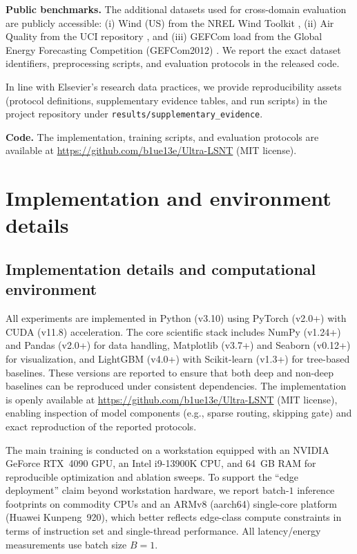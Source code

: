 \documentclass[review,3p,times]{elsarticle}
\begin{document}
\textbf{Public benchmarks.} The additional datasets used for cross-domain evaluation are publicly accessible: (i) Wind (US) from the NREL Wind Toolkit \cite{draxl2015windtoolkit}, (ii) Air Quality from the UCI repository \cite{devito2008}, and (iii) GEFCom load from the Global Energy Forecasting Competition (GEFCom2012) \cite{Hong2014GEFCom2012}. We report the exact dataset identifiers, preprocessing scripts, and evaluation protocols in the released code.

In line with Elsevier's research data practices, we provide reproducibility assets (protocol definitions, supplementary evidence tables, and run scripts) in the project repository under \texttt{results/supplementary\_evidence}.

\textbf{Code.} The implementation, training scripts, and evaluation protocols are available at \url{https://github.com/b1ue13e/Ultra-LSNT} (MIT license).

\appendix

\section{Implementation and environment details}\label{app:impl_details}

\subsection{Implementation details and computational environment}
\label{app:impl_details_sub}

All experiments are implemented in Python (v3.10) using PyTorch (v2.0+) with CUDA (v11.8) acceleration. The core scientific stack includes NumPy (v1.24+) and Pandas (v2.0+) for data handling, Matplotlib (v3.7+) and Seaborn (v0.12+) for visualization, and LightGBM (v4.0+) with Scikit-learn (v1.3+) for tree-based baselines. These versions are reported to ensure that both deep and non-deep baselines can be reproduced under consistent dependencies. The implementation is openly available at \url{https://github.com/b1ue13e/Ultra-LSNT} (MIT license), enabling inspection of model components (e.g., sparse routing, skipping gate) and exact reproduction of the reported protocols.

The main training is conducted on a workstation equipped with an NVIDIA GeForce RTX~4090 GPU, an Intel i9-13900K CPU, and 64~GB RAM for reproducible optimization and ablation sweeps. To support the ``edge deployment'' claim beyond workstation hardware, we report batch-$1$ inference footprints on commodity CPUs and an ARMv8 (aarch64) single-core platform (Huawei Kunpeng~920), which better reflects edge-class compute constraints in terms of instruction set and single-thread performance. All latency/energy measurements use batch size $B=1$.
\end{document}
